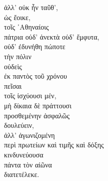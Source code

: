 {\large
\begin{greek}
\noindent ἀλλ' οὐκ ἦν ταῦθ', \\
\tabto{2em} ὡς ἔοικε, \\
τοῖς ᾿Αθηναίοις \\
\tabto{2em} πάτρια οὐδ' ἀνεκτὰ οὐδ' ἔμφυτα,\\
οὐδ' ἐδυνήθη πώποτε \\
\tabto{2em} τὴν πόλιν \\
οὐδεὶς \\
\tabto{4em} ἐκ παντὸς τοῦ χρόνου \\
\tabto{2em} πεῖσαι \\
\tabto{4em} τοῖς ἰσχύουσι μέν, \\
\tabto{4em} μὴ δίκαια δὲ πράττουσι \\
\tabto{2em} προσθεμένην ἀσφαλῶς \\
\tabto{2em} δουλεύειν, \\
ἀλλ' ἀγωνιζομένη \\
\tabto{2em} περὶ πρωτείων καὶ τιμῆς καὶ δόξης \\
κινδυνεύουσα \\
\tabto{2em} πάντα τὸν αἰῶνα \\
διατετέλεκε.\\

\end{greek}
}

